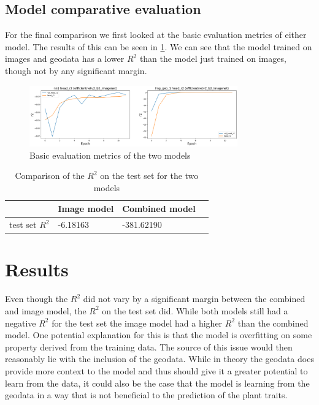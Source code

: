 \documentclass[12pt,a4paper,oneside]{article}
\begin{document}

\subsection{Model comparative evaluation}


For the final comparison we first looked at the basic evaluation metrics of either model. The results of this can be seen in \ref{fig:basic_evaluation}. We can see that the model trained on images and geodata has a lower $R^2$ than the model just trained on images, though not by any significant margin. 

\begin{figure}[!h]
    \centering
    \includegraphics[width=0.8\textwidth]{assets/fin_img_vs_geo.png}
    \caption{Basic evaluation metrics of the two models}
    \label{fig:basic_evaluation}
\end{figure}

\begin{table}[!h]
    \centering
    \begin{tabular}{@{}llll@{}}
    \toprule
    & Image model & Combined model \\ \midrule
    test set $R^2$              & -6.18163             & -381.62190   \\ \bottomrule
\end{tabular}
\caption{Comparison of the $R^2$ on the test set for the two models}
\end{table}

\section{Results}

Even though the $R^2$ did not vary by a significant margin between the combined and image model, the $R^2$ on the test set did. While both models still had a negative $R^2$ for the test set the image model had a higher $R^2$ than the combined model. One potential explanation for this is that the model is overfitting on some property derived from the training data. The source of this issue would then reasonably lie with the inclusion of the geodata. While in theory the geodata does provide more context to the model and thus should give it a greater potential to learn from the data, it could also be the case that the model is learning from the geodata in a way that is not beneficial to the prediction of the plant traits.   
\end{document}
